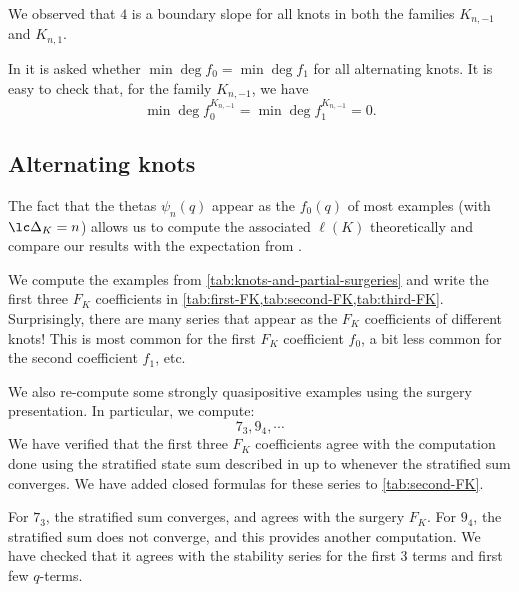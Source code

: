 \documentclass[11pt,e-only]{amsart}
\begin{document}

We observed that $4$ is a boundary slope for all knots in both the families $K_{n,-1}$ and $K_{n,1}$. 

\begin{remark} In \cite{L-inv} it is asked whether $\min\deg f_0=\min\deg f_1$ for all alternating knots. It is easy to check that, for the family $K_{n,-1}$, we have 
\begin{equation}
    \min\deg f_0^{K_{n,-1}}=\min\deg f_1^{K_{n,-1}}=0.
\end{equation} %
\end{remark}

\subsection{Alternating knots}

The fact that the thetas $\psi_n(q)$ appear as the $f_0(q)$ of most examples (with $\lc \Delta_K=n$) allows us to compute the associated $\ell(K)$ theoretically and compare our results with the expectation from \cite[Section 7]{L-inv}.

We compute the examples from \cref{tab:knots-and-partial-surgeries} and write the first three $F_K$ coefficients in \cref{tab:first-FK,tab:second-FK,tab:third-FK}. Surprisingly, there are many series that appear as the $F_K$ coefficients of different knots! This is most common for the first $F_K$ coefficient $f_0$, a bit less common for the second coefficient $f_1$, etc.

We also re-compute some strongly quasipositive examples using the surgery presentation. In particular, we compute:
\begin{equation}
    7_3,9_4,\cdots
\end{equation}
We have verified that the first three $F_K$ coefficients agree with the computation done using the stratified state sum described in \cite{Park20,L-inv} up to  whenever the stratified sum converges. We have added closed formulas for these series to \cref{tab:second-FK}.

For $7_3$, the stratified sum converges, and agrees with the surgery $F_K$. For $9_4$, the stratified sum does not converge, and this provides another computation. We have checked that it agrees with the stability series for the first 3 terms and first few $q$-terms.
\end{document}
